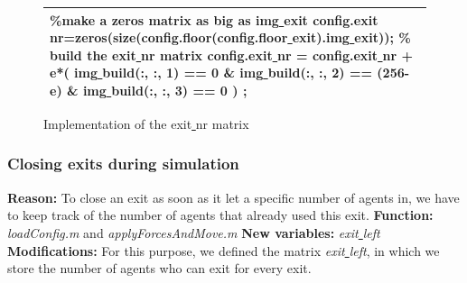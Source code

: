 \documentclass[11pt]{article}
\begin{document}
\begin{figure}[h]
\centering
\begin{tabular}
{|>{\large}m{\textwidth}|} \hline
\bigskip

\textcolor{commentcolor}{\%make a zeros matrix as big as img\underline{ }exit}
\newline
config.exit\underline{ }nr=zeros(size(config.floor(config.floor\underline{ }exit).img\underline{ }exit));
\newline
\textcolor{commentcolor}{\% build the exit\underline{ }nr matrix}
\newline
config.exit\underline{ }nr = config.exit\underline{ }nr + e*( img\underline{ }build(:, :, 1) == 0 \& img\underline{ }build(:, :, 2) == (256-e) \& img\underline{ }build(:, :, 3) == 0 ) ;
\bigskip
\\ \hline
\end{tabular}
\caption{Implementation of the exit\underline{ }nr matrix}
\end{figure}
\subsubsection{Closing exits during simulation}

\textbf{Reason:}
\newline
To close an exit as soon as it let a specific number of agents in, we have to keep track of the number of agents that already used this exit.
\newline
\textbf{Function:}
\newline
\textit{loadConfig.m} and \textit{applyForcesAndMove.m}
\newline
 \textbf{New variables:}
\newline
\textit{exit\underline{ }left}
\newline
\textbf{Modifications:}
\newline
For this purpose, we defined the matrix \textit{exit\underline{ }left}, in which we store the number of agents who can exit for every exit.
\end{document}

